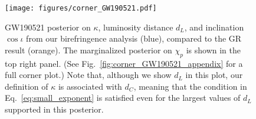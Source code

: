\documentclass[aps,prd,twocolumn,superscriptaddress,preprintnumbers,nofootinbib]{revtex4-2}
\begin{document}
\begin{figure}
    \texttt{[image: figures/corner\_GW190521.pdf]}
    \caption{
        GW190521 posterior on $\kappa$, luminosity distance $d_L$, and inclination $\cos\iota$ from our birefringence analysis (blue), compared to the GR result (orange).
        The marginalized posterior on $\chi_p$ is shown in the top right panel. (See Fig.~\ref{fig:corner_GW190521_appendix} for a full corner plot.)
        Note that, although we show $d_L$ in this plot, our definition of $\kappa$ is associated with $d_C$, meaning that the condition in Eq.~\eqref{eq:small_exponent} is satisfied even for the largest values of $d_L$ supported in this posterior.
    }
    \label{fig:corner_GW190521}
\end{figure}

% 
% 
\end{document}
